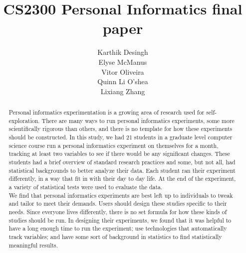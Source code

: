 \documentclass{sigchi}
\begin{document}
\title{CS2300 Personal Informatics final paper}

\author{
  \alignauthor Karthik Desingh\\
  \alignauthor Elyse McManus\\
  \alignauthor Vitor Oliveira\\
  \alignauthor Quinn Li O'shea\\
  \alignauthor Lixiang Zhang\\
}

\maketitle

\begin{abstract}
Personal informatics experimentation is a growing area of research used for self-exploration. There are many ways to run personal informatics experiments, some more scientifically rigorous than others, and there is no template for how these experiments should be constructed. In this study, we had 21 students in a graduate level computer science course run a personal informatics experiment on themselves for a month, tracking at least two variables to see if there would be any significant changes. These students had a brief overview of standard research practices and some, but not all, had statistical backgrounds to better analyze their data. Each student ran their experiment differently, in a way that fit in with their day to day life. At the end of the experiment, a variety of statistical tests were used to evaluate the data. 
\\
We find that personal informatics experiments are best left up to individuals to tweak and tailor to meet their demands. Users should design these studies specific to their needs. Since everyone lives differently, there is no set formula for how these kinds of studies should be run. In designing their experiments, we found that it was helpful to have a long enough time to run the experiment; use technologies that automatically track variables; and have some sort of background in statistics to find statistically meaningful results. 
\end{abstract}
%
\end{document}
